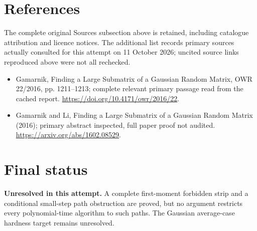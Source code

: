 \documentclass[11pt]{article}
\begin{document}
\section{References}
The complete original Sources subsection above is retained, including catalogue attribution and licence notices. The additional list records primary sources actually consulted for this attempt on 11 October 2026; uncited source links reproduced above were not all rechecked.
\begin{itemize}
\item Gamarnik, Finding a Large Submatrix of a Gaussian Random Matrix, OWR 22/2016, pp. 1211--1213; complete relevant primary passage read from the cached report. \url{https://doi.org/10.4171/owr/2016/22}.
\item Gamarnik and Li, Finding a Large Submatrix of a Gaussian Random Matrix (2016); primary abstract inspected, full paper proof not audited. \url{https://arxiv.org/abs/1602.08529}.
\end{itemize}
\section{Final status}
\textbf{Unresolved in this attempt.} A complete first-moment forbidden strip and a conditional small-step path obstruction are proved, but no argument restricts every polynomial-time algorithm to such paths. The Gaussian average-case hardness target remains unresolved.
\end{document}
